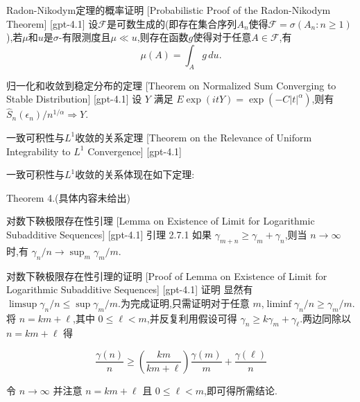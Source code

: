 \documentclass[UTF8]{ctexart}
\begin{document}
    
    
    \begin{thm}
        {Radon-Nikodym定理的概率证明}
        [Probabilistic Proof of the Radon-Nikodym Theorem]
        [gpt-4.1]
        设$\mathcal{F}$是可数生成的(即存在集合序列$A_n$使得$\mathcal{F} = \sigma(A_n : n \geq 1)$),若$\mu$和$
u$是$\sigma$-有限测度且$\mu \ll 
u$,则存在函数$g$使得对于任意$A \in \mathcal{F}$,有
\[
\mu(A) = \int_A g\, d
u.
\]

    \end{thm}
    
    
    
    \begin{thm}
        {归一化和收敛到稳定分布的定理}
        [Theorem on Normalized Sum Converging to Stable Distribution]
        [gpt-4.1]
        设 $Y$ 满足 $E \exp(i t Y) = \exp(-C|t|^{\alpha})$,则有 $\hat{S}_{n}(\epsilon_{n}) / n^{1/\alpha} \Rightarrow Y$.
    \end{thm}
    
    
    
    \begin{thm}
        {一致可积性与$L^1$收敛的关系定理}
        [Theorem on the Relevance of Uniform Integrability to $L^1$ Convergence]
        [gpt-4.1]
        
一致可积性与$L ^ { 1 }$收敛的关系体现在如下定理:

Theorem 4.(具体内容未给出)

    \end{thm}
    
    
    
    \begin{lma}
        {对数下鞅极限存在性引理}
        [Lemma on Existence of Limit for Logarithmic Subadditive Sequences]
        [gpt-4.1]
        引理 2.7.1 如果 $\gamma_{m + n} \geq \gamma_{m} + \gamma_{n}$,则当 $n \to \infty$ 时,有 $\gamma_{n} / n \to \operatorname*{sup}_{m} \gamma_{m} / m$.
    \end{lma}
    
    
    
    \begin{prf}
        {对数下鞅极限存在性引理的证明}
        [Proof of Lemma on Existence of Limit for Logarithmic Subadditive Sequences]
        [gpt-4.1]
        证明 显然有 $\limsup \gamma_{n} / n \leq \operatorname*{sup} \gamma_{m} / m$.为完成证明,只需证明对于任意 $m$,$\liminf \gamma_{n} / n \geq \gamma_{m} / m$.将 $n = k m + \ell$,其中 $0 \leq \ell < m$,并反复利用假设可得 $\gamma_{n} \geq k \gamma_{m} + \gamma_{\ell}$.两边同除以 $n = k m + \ell$ 得

\[
\frac{\gamma ( n )}{n} \geq \left( \frac{k m}{k m + \ell} \right) \frac{\gamma ( m )}{m} + \frac{\gamma ( \ell )}{n}
\]

令 $n \to \infty$ 并注意 $n = k m + \ell$ 且 $0 \leq \ell < m$,即可得所需结论.
    \end{prf}
    
\end{document}
